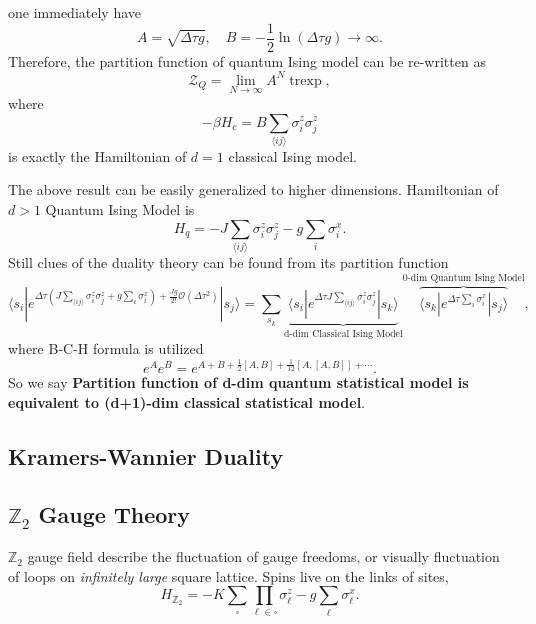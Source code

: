 \documentclass[10pt,nofootinbib]{revtex4}
\numberwithin{equation}{section}
\begin{document}
		one immediately have
		\begin{equation}\label{1.1.3}
			A=\sqrt{\Delta \tau g},\quad B=-\dfrac{1}{2}\ln(\Delta\tau g)\rightarrow\infty.
		\end{equation}
		Therefore, the partition function of quantum Ising model can be re-written as
		\begin{equation}\label{1.1.4}
			\mathcal{Z}_{Q}=\lim_{N\rightarrow\infty}A^N\mathop{\mathrm{tr}\exp \left(-\beta H_{c}\right) },
		\end{equation}
		where
		\begin{equation}\label{1.1.5}
			-\beta H_{c}=B\sum_{\langle ij\rangle}\sigma_i^z\sigma_j^z
		\end{equation}
		is exactly the Hamiltonian of $d=1$ classical Ising model.\par

		The above result can be easily generalized to higher dimensions. Hamiltonian of $d>1$ Quantum Ising Model is
		\begin{equation}\label{1.2.1}
			H_q=-J\sum_{\langle ij\rangle}\sigma_i^z\sigma_j^z-g\sum_i\sigma_i^x.
		\end{equation}
		Still clues of the duality theory can be found from its partition function
		\begin{equation}\label{1.2.2}
			\langle s_i|e^{\Delta\tau(J\sum_{\langle ij\rangle}\sigma_i^z\sigma_j^z+g\sum_i\sigma_i^x)+\frac{Jg}{2!}\mathcal{O}(\Delta\tau^2)}|s_j\rangle=\sum_{s_k}\underbrace{\langle s_i|e^{\Delta\tau J\sum_{\langle ij\rangle}\sigma_i^z\sigma_j^z}|s_k\rangle}_{\text{d-dim Classical Ising Model}}\overbrace{\langle s_k|e^{\Delta\tau\sum_i\sigma_i^x}|s_j\rangle}^{\text{0-dim  Quantum Ising Model}},
		\end{equation}
		where B-C-H formula is utilized
		\begin{equation*}
			e^{A}e^B=e^{A+B+\frac12[A,B]+\frac{1}{12}[A,[A,B]]+\cdots}.
		\end{equation*}
		So we say \cite{hsieh2016d} {\color{red}\textbf{Partition function of d-dim quantum statistical model is equivalent to (d+1)-dim classical statistical model}}.
	\subsection{Kramers-Wannier Duality}
	\subsection{$\mathbb{Z}_2$ Gauge Theory}
		$\mathbb{Z}_2$ gauge field describe the fluctuation of gauge freedoms, or visually fluctuation of loops on \emph{infinitely large} square lattice. Spins live on the links of sites, 
		\begin{equation}\label{2.1.1}
			H_{\mathbb{Z}_2}=-K\sum_\square\prod_{\ell\in\square}\sigma_\ell^z-g\sum_\ell\sigma_\ell^x.
		\end{equation}
\end{document}
